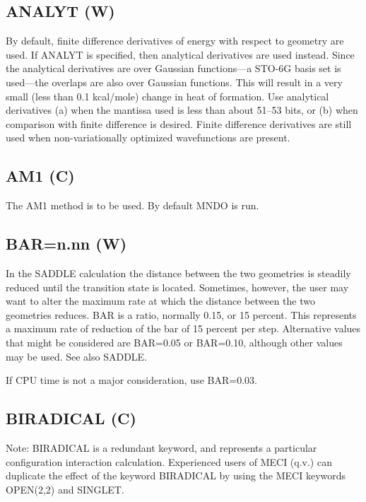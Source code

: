 \documentclass[a4paper]{book}
\newcommand{\mi}[1]{#1\index{#1}}
\begin{document}
\subsection*{ANALYT (W)}
      By default, finite difference derivatives of energy with respect  to
 geometry  are  used.  If \mi{ANALYT} is specified, then analytical derivatives
 are used instead.  Since the analytical  derivatives  are  over  Gaussian
 functions---a  STO-6G  basis set is used---the overlaps are also over
 Gaussian functions.  This will result in a  very  small  (less  than  0.1
 kcal/mole)  change  in heat of formation.  Use analytical derivatives (a)
 when the mantissa used is  less  than  about 51--53  bits,  or  (b)  when
 comparison   with   finite  difference  is  desired.   Finite  difference
 derivatives are still used when non-variationally optimized wavefunctions
 are present.


\subsection*{AM1 (C)}
The \mi{AM1} method is to be used.  By default MNDO is run.

\subsection*{BAR=n.nn (W)}
In the SADDLE calculation the distance between the two geometries is
   steadily  reduced  until  the  transition  state  is located.  Sometimes,
   however, the user may want  to  alter  the  maximum  rate  at  which  the
   distance  between  the  two geometries reduces. \mi{BAR} is a ratio, normally
   0.15, or 15 percent.  This represents a maximum rate of reduction of  the
   bar  of 15 percent per step.  Alternative values that might be considered
   are BAR=0.05 or BAR=0.10, although other values may be  used.   See  also
   SADDLE.

   If CPU time is not a major consideration, use BAR=0.03.


                                 
\subsection*{BIRADICAL (C)}
   Note: \mi{BIRADICAL} is a redundant keyword, and represents a particular
   configuration  interaction calculation.  Experienced users of MECI (q.v.)
   can duplicate the effect of the  keyword  BIRADICAL  by  using  the  MECI
   keywords OPEN(2,2) and SINGLET.
\end{document}
